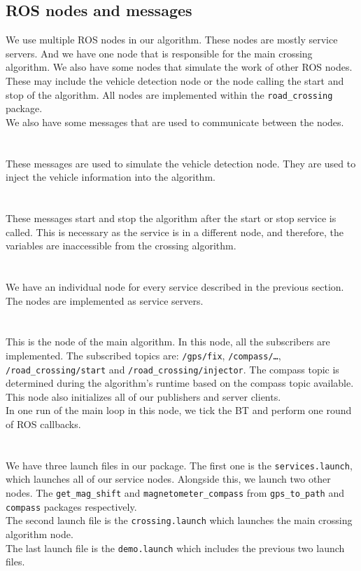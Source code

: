     \subsection{ROS nodes and messages}
        We use multiple ROS nodes in our algorithm. These nodes are mostly service servers. And we have one node that is responsible for the main crossing algorithm. We also have some nodes that simulate the work of other ROS nodes. These may include the vehicle detection node or the node calling the start and stop of the algorithm. All nodes are implemented within the \texttt{road\_crossing} package.\\
        We also have some messages that are used to communicate between the nodes.\\\\
        \\
            These messages are used to simulate the vehicle detection node. They are used to inject the vehicle information into the algorithm.\\\\
        \\
            These messages start and stop the algorithm after the start or stop service is called. This is necessary as the service is in a different node, and therefore, the variables are inaccessible from the crossing algorithm.\\\\
        \\
            We have an individual node for every service described in the previous section. The nodes are implemented as service servers.\\\\
        \\
            This is the node of the main algorithm. In this node, all the subscribers are implemented. The subscribed topics are: \texttt{/gps/fix}, \texttt{/compass/\ldots}, \texttt{/road\_crossing/start} and \texttt{/road\_crossing/injector}. The compass topic is determined during the algorithm's runtime based on the compass topic available. This node also initializes all of our publishers and server clients.\\
            In one run of the main loop in this node, we tick the BT and perform one round of ROS callbacks.\\\\
        \\
            We have three launch files in our package. The first one is the \texttt{services.launch}, which launches all of our service nodes. Alongside this, we launch two other nodes. The \texttt{get\_mag\_shift} and \texttt{magnetometer\_compass} from \texttt{gps\_to\_path} and \texttt{compass} packages respectively.\\
            The second launch file is the \texttt{crossing.launch} which launches the main crossing algorithm node.\\
            The last launch file is the \texttt{demo.launch} which includes the previous two launch files.
    